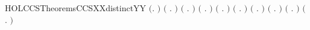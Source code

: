 \begin{SaveVerbatim}{HOLCCSTheoremsCCSXXdistinctYY}
\HOLTokenTurnstile{} \ensuremath{(}\HOLSymConst{\HOLTokenForall{}}.  \HOLSymConst{\HOLTokenNotEqual{}}  \ensuremath{)} \HOLSymConst{\HOLTokenConj{}} \ensuremath{(}\HOLSymConst{\HOLTokenForall{}} .  \HOLSymConst{\HOLTokenNotEqual{}} \HOLSymConst{\ensuremath{\ldotp}}\ensuremath{)} \HOLSymConst{\HOLTokenConj{}}
   \ensuremath{(}\HOLSymConst{\HOLTokenForall{}} .  \HOLSymConst{\HOLTokenNotEqual{}}  \HOLSymConst{\ensuremath{+}} \ensuremath{)} \HOLSymConst{\HOLTokenConj{}} \ensuremath{(}\HOLSymConst{\HOLTokenForall{}} .  \HOLSymConst{\HOLTokenNotEqual{}}  \HOLSymConst{\ensuremath{\mid}} \ensuremath{)} \HOLSymConst{\HOLTokenConj{}}
   \ensuremath{(}\HOLSymConst{\HOLTokenForall{}} .  \HOLSymConst{\HOLTokenNotEqual{}}   \ensuremath{)} \HOLSymConst{\HOLTokenConj{}} \ensuremath{(}\HOLSymConst{\HOLTokenForall{}} .  \HOLSymConst{\HOLTokenNotEqual{}}   \ensuremath{)} \HOLSymConst{\HOLTokenConj{}}
   \ensuremath{(}\HOLSymConst{\HOLTokenForall{}} .  \HOLSymConst{\HOLTokenNotEqual{}}   \ensuremath{)} \HOLSymConst{\HOLTokenConj{}} \ensuremath{(}\HOLSymConst{\HOLTokenForall{}}  .   \HOLSymConst{\HOLTokenNotEqual{}} \HOLSymConst{\ensuremath{\ldotp}}\ensuremath{)} \HOLSymConst{\HOLTokenConj{}}
   \ensuremath{(}\HOLSymConst{\HOLTokenForall{}}  .   \HOLSymConst{\HOLTokenNotEqual{}}  \HOLSymConst{\ensuremath{+}} \ensuremath{)} \HOLSymConst{\HOLTokenConj{}} \ensuremath{(}\HOLSymConst{\HOLTokenForall{}}  .   \HOLSymConst{\HOLTokenNotEqual{}}  \HOLSymConst{\ensuremath{\mid}} \ensuremath{)} \HOLSymConst{\HOLTokenConj{}}

\end{SaveVerbatim}
